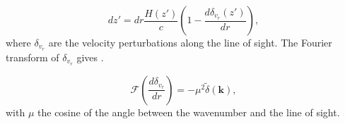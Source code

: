 \documentclass[twocolumns]{emulateapj}
\newcommand\ALc[1]{{\color{red} \bf #1}} %
\begin{document}
{{  \begin{equation}
    \label{eq:vel_perturb}
    dz'=dr\frac{H(z')}{c}\left(1-\frac{d\delta_{v_r}(z')}{dr}\right),
  \end{equation}
where $\delta_{v_r}$ are the velocity perturbations along the line of sight. The Fourier transform of $\delta_{v_r}$ gives  \citep{1987MNRAS.227....1K}.

\begin{equation}
  \label{eq:kaiser2}
  \mathcal{F}\left(\frac{d\delta_{v_r}}{dr}\right)=-\mu^2\tilde{\delta}(\mathbf{k}),
\end{equation}
with $\mu$ the cosine of the angle between the wavenumber and the line of sight.
}


%




}
\end{document}
